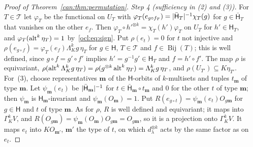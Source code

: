 \begin{proof}[Proof of Theorem~\ref{can:thm:permutation}]
\emph{Step 4 (sufficiency in (2) and (3)).} For $T\in\mathcal T$ let $\varphi_T$ be the functional on $U_T$ with
$\varphi_T(e_{g\circ f_T})=\lvert \bar{\mathsf H}_T\rvert^{-1}\chi_T(g)$ for $g\in\bar{\mathsf H}_T$ that vanishes on the other
$e_f$. Then $\varphi_T\circ h'^{\otimes k}=\chi_T(h')\varphi_T$ on $U_T$ for $h'\in\mathsf H_T$, and
$\varphi_T(\operatorname{alt}^k\eta_T)=1$ by~\eqref{ocl:eq:sign}. Put $\rho(e_t)=0$ for $t$ not injective and $\rho(e_{g\circ
f})=\varphi_T(e_f)\Lambda^k_Kg\,\eta_T$ for $g\in\mathsf H$, $T\in\mathcal T$ and $f\in\operatorname{Bij}(T)$; this is
well defined, since $g\circ f=g'\circ f'$ implies $h'=g^{-1}g'\in\mathsf H_T$ and $f=h'\circ f'$. The map $\rho$ is
equivariant, $\rho(\operatorname{alt}^k\Lambda^k_Kg\,\eta_T)=\rho(g^{\otimes k}\operatorname{alt}^k\eta_T)=\Lambda^k_Kg\,\eta_T$, and
$\rho(U_{T'})\subseteq K\eta_{T'}$. For~(3), choose representatives $\mathbf m$ of the $\mathsf H$-orbits of
$k$-multisets and tuples $t_{\mathbf m}$ of type $\mathbf m$. Let $\psi_{\mathbf m}(e_t)$ be $\lvert \bar{\mathsf
H}_{\mathbf m}\rvert^{-1}$ for $t\in\bar{\mathsf H}_{\mathbf m}\circ t_{\mathbf m}$ and $0$ for the other $t$ of type
$\mathbf m$; then $\psi_{\mathbf m}$ is $\mathsf H_{\mathbf m}$-invariant and $\psi_{\mathbf m}(O_{\mathbf m})=1$. Put
$R(e_{g\circ t})=\psi_{\mathbf m}(e_t)O_{g\mathbf m}$ for $g\in\mathsf H$ and $t$ of type $\mathbf m$. As for $\rho$,
$R$ is well defined and equivariant; it maps into $\Gamma^k_KV$, and $R(O_{g\mathbf m})=\psi_{\mathbf m}(O_{\mathbf
m})O_{g\mathbf m}=O_{g\mathbf m}$, so it is a projection onto $\Gamma^k_KV$. It maps $e_t$ into $KO_{\mathbf m'}$,
$\mathbf m'$ the type of $t$, on which $d_\lambda^{\otimes k}$ acts by the same factor as on $e_t$.
\end{proof}

